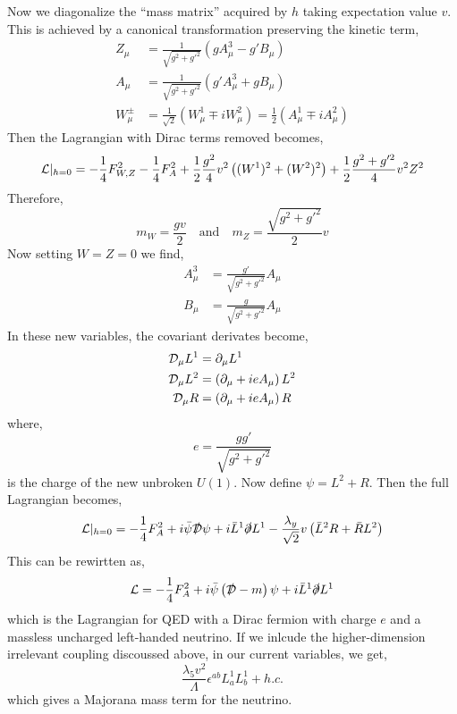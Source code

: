 \documentclass[12pt]{extarticle}
\begin{document}
Now we diagonalize the ``mass matrix'' acquired by $h$ taking expectation value $v$. This is achieved by a canonical transformation preserving the kinetic term,
\begin{align*}
Z_\mu & = \frac{1}{\sqrt{g^2 + g'^2}} \left( g A_\mu^3 - g' B_\mu \right) 
\\
A_\mu & = \frac{1}{\sqrt{g^2 + g'^2}} \left( g' A_\mu^3 + g B_\mu \right)
\\
W^{\pm}_\mu & = \frac{1}{\sqrt{2}} \left( W^1_\mu \mp i W_\mu^2 \right) = \frac{1}{2} \left( A^1_\mu \mp i A_\mu^2 \right) 
\end{align*}
Then the Lagrangian with Dirac terms removed becomes,
\begin{align*}
\mathcal{L} |_{h = 0} = - \frac{1}{4} F_{W,Z}^2 - \frac{1}{4} F_A^2 + \frac{1}{2} \frac{g^2}{4} v^2 \left( (W^1)^2 + (W^2)^2 \right) + \frac{1}{2} \frac{g^2 + g'^2}{4} v^2 Z^2
\end{align*}
Therefore,
\[ m_W = \frac{gv}{2} \quad \text{and} \quad m_Z = \frac{\sqrt{g^2 + g'^2}}{2} v \]
Now setting $W = Z = 0$ we find,
\begin{align*}
A_\mu^3 & = \frac{g'}{\sqrt{g^2 + g'^2}} A_\mu 
\\
B_\mu & = \frac{g}{\sqrt{g^2 + g'^2}} A_\mu 
\end{align*}
In these new variables, the covariant derivates become,
\begin{align*}
\mathcal{D}_\mu L^1 & = \partial_\mu L^1
\\
\mathcal{D}_\mu L^2 & = \left( \partial_\mu + i e A_\mu \right) L^2
\\
\mathcal{D}_\mu R & = \left( \partial_\mu + i e A_\mu \right) R 
\end{align*}
where,
\[ e = \frac{g g'}{\sqrt{g^2 + g'^2}} \]
is the charge of the new unbroken $U(1)$. Now define $\psi = L^2 + R$. Then the full Lagrangian becomes,
\begin{align*}
\mathcal{L} |_{h = 0} = - \frac{1}{4} F_A^2 + i \bar{\psi} \slashed{\mathcal{D}} \psi + i \bar{L}^1 \slashed{\partial} L^1 - \frac{\lambda_y}{\sqrt{2}} v \left( \bar{L}^2 R + \bar{R} L^2 \right) 
\end{align*}  
This can be rewirtten as,
\[ \mathcal{L} = - \frac{1}{4} F_A^2 + i \bar{\psi} \left( \slashed{\mathcal{D}} - m \right) \psi + i \bar{L}^1 \slashed{\partial} L^1 \]
which is the Lagrangian for QED with a Dirac fermion with charge $e$ and a massless uncharged left-handed neutrino. If we inlcude the higher-dimension irrelevant coupling discoussed above, in our current variables, we get,
\[ \frac{\lambda_5 v^2}{\Lambda} \epsilon^{ab} L^1_a L^1_b + h.c. \]
which gives a Majorana mass term for the neutrino.  
\end{document}

